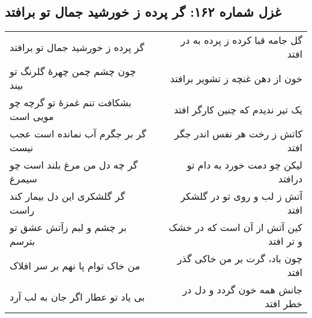 \begin{center}
\section*{غزل شماره ۱۶۲: گر پرده ز خورشید جمال تو برافتد}
\label{sec:162}
\begin{longtable}{l p{0.5cm} r}
گر پرده ز خورشید جمال تو برافتد
&&
گل جامه قبا کرده ز پرده به در افتد
\\
چون چشم چمن چهرهٔ گلرنگ تو بیند
&&
خون از دهن غنچه ز تشویر برافتد
\\
بشکافت تنم غمزهٔ تو گرچه چو مویی است
&&
یک تیر ندیدم که چنین کارگر افتد
\\
گر بر جگرم آب نمانده است عجب نیست
&&
کاتش ز رخت هر نفس اندر جگر افتد
\\
گر چه دل من مرغ بلند است چو سیمرغ
&&
لیکن چو دمت خورد به دام تو درافتد
\\
گر گلشکری این دل بیمار کند راست
&&
آتش ز لب و روی تو در گلشکر افتد
\\
بر چشم و لبم زآتش عشق تو بترسم
&&
کین آتش از آن است که در خشک و تر افتد
\\
من خاک توام پا نهم بر سر افلاک
&&
چون باد، گرت بر من خاکی گذر افتد
\\
بی یاد تو عطار اگر جان به لب آرد
&&
جانش همه خون گردد و دل در خطر افتد
\\
\end{longtable}
\end{center}
